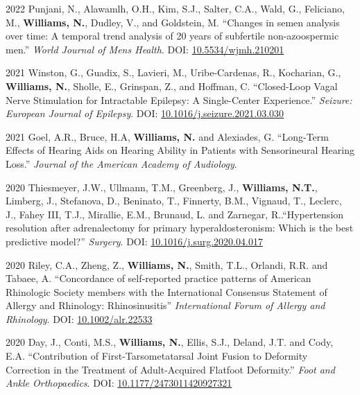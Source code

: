 \documentclass[12pt,letterpaper]{report}
\begin{document}
\begin{tablist}
    \item[2022] \tab Punjani, N., Alawamlh, O.H., Kim, S.J., Salter, C.A., Wald, G., Feliciano, M., \textbf{Williams, N.}, Dudley, V., and Goldstein, M. \enquote{Changes in semen analysis over time: A temporal trend analysis of 20 years of subfertile non-azoospermic men.} \textit{World Journal of Mens Health}. DOI: \href{https://doi.org/10.5534/wjmh.210201}{10.5534/wjmh.210201}
    
     \item[2021] \tab Winston, G., Guadix, S., Lavieri, M., Uribe-Cardenas, R., Kocharian, G., \textbf{Williams, N.}, Sholle, E., Grinspan, Z., and Hoffman, C. \enquote{Closed-Loop Vagal Nerve Stimulation for Intractable Epilepsy: A Single-Center Experience.} \textit{Seizure: European Journal of Epilepsy}. DOI: \href{https://doi.org/10.1016/j.seizure.2021.03.030}{10.1016/j.seizure.2021.03.030}
    
    \item[2021] \tab Goel, A.R., Bruce, H.A, \textbf{Williams, N.} and Alexiades, G. \enquote{Long-Term Effects of Hearing Aids on Hearing Ability in Patients with Sensorineural Hearing Loss.} \textit{Journal of the American Academy of Audiology}.
    
    \item[2020] \tab Thiesmeyer, J.W., Ullmann, T.M., Greenberg, J., \textbf{Williams, N.T.}, Limberg, J., Stefanova, D., Beninato, T., Finnerty, B.M., Vignaud, T., Leclerc, J., Fahey III, T.J., Mirallie, E.M., Brunaud, L. and Zarnegar, R..\enquote{Hypertension resolution after adrenalectomy for primary hyperaldosteronism: Which is the best predictive model?} \textit{Surgery}. DOI: \href{https://doi.org/10.1016/j.surg.2020.04.017}{10.1016/j.surg.2020.04.017}  
	
	\item[2020] \tab Riley, C.A., Zheng, Z., \textbf{Williams, N.}, Smith, T.L., Orlandi, R.R. and Tabaee, A. \enquote{Concordance of self‐reported practice patterns of American Rhinologic Society members with the International Consensus Statement of Allergy and Rhinology: Rhinosinusitis} \textit{International Forum of Allergy and Rhinology}. DOI: \href{https://doi.org/10.1002/alr.22533}{10.1002/alr.22533} 
	
	\item[2020] \tab Day, J., Conti, M.S., \textbf{Williams, N.}, Ellis, S.J., Deland, J.T. and Cody, E.A. \enquote{Contribution of First-Tarsometatarsal Joint Fusion to Deformity Correction in the Treatment of Adult-Acquired Flatfoot Deformity.} \textit{Foot and Ankle Orthopaedics}. DOI: \href{https://doi.org/10.1177/2473011420927321}{10.1177/2473011420927321}
	

\end{tablist}
\end{document}
